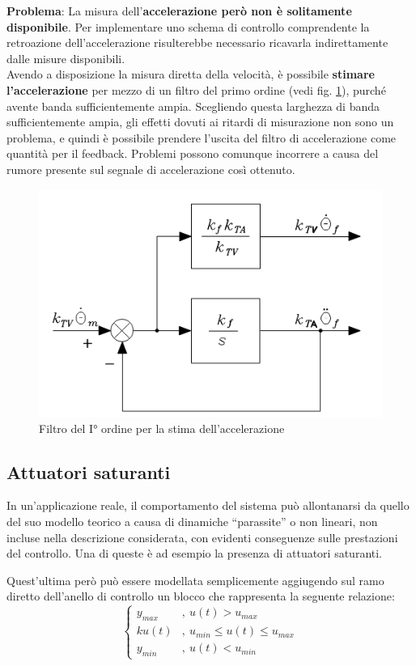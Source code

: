 \textbf{Problema}:
La misura dell’\textbf{accelerazione però non è solitamente disponibile}. Per implementare uno schema di controllo comprendente la retroazione dell’accelerazione risulterebbe necessario ricavarla indirettamente dalle misure disponibili.\\

Avendo a disposizione la misura diretta della velocità, è possibile \textbf{stimare l’accelerazione} per mezzo di un filtro del primo ordine (vedi fig. \ref{fig:accelerationestimate}), purché avente banda sufficientemente ampia. Scegliendo questa larghezza di banda sufficientemente ampia, gli effetti dovuti ai ritardi di misurazione non sono un problema, e quindi è possibile prendere l'uscita del filtro di accelerazione come quantità per il feedback. Problemi possono comunque incorrere a causa del rumore presente sul segnale di accelerazione così ottenuto.

\begin{figure}[H]
	\centering
	\includegraphics[width=0.4\linewidth]{images/acceleration_estimate}
	\caption{Filtro del I° ordine per la stima dell'accelerazione}
	\label{fig:accelerationestimate}
\end{figure}







\subsection{Attuatori saturanti}
In un’applicazione reale, il comportamento del sistema può allontanarsi da quello del suo modello teorico a causa di dinamiche “parassite” o non lineari, non incluse nella descrizione considerata, con evidenti conseguenze sulle prestazioni del controllo. Una di queste è ad esempio la presenza di attuatori saturanti.

Quest'ultima però può essere modellata semplicemente aggiugendo sul ramo diretto dell’anello di controllo un blocco che rappresenta la seguente relazione:
$$
\begin{cases}
	y_{max} & , \ u(t) > u_{max} \\
	ku(t) & , \ u_{min} \leq u(t) \leq u_{max} \\
	y_{min} & , \ u(t) < u_{min}
\end{cases}
$$


